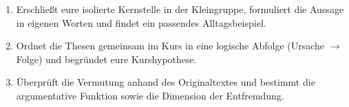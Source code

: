 \documentclass[a4paper, 11pt, parskip=half]{scrartcl}
\begin{document}
\vspace{0.2cm}

\begin{tcolorbox}[
    enhanced, colback=lightBlue, colframe=primaryBlue, boxrule=0.8pt, arc=1mm,
    title=\textbf{Methode: Kernaussagen-Rekonstruktion},
    fonttitle=\small\bfseries\color{white},
    boxed title style={colback=primaryBlue, arc=0mm, boxrule=0pt},
    attach boxed title to top left={yshift=-2mm, xshift=2mm},
    boxsep=4pt, bottom=5pt, top=6pt
]
\small\sffamily
\begin{enumerate}[leftmargin=0.55cm, itemsep=0.08cm, topsep=0.04cm]
    \item Erschließt eure isolierte Kernstelle in der Kleingruppe, formuliert die Aussage in eigenen Worten und findet ein passendes Alltagsbeispiel.
    \item Ordnet die Thesen gemeinsam im Kurs in eine logische Abfolge (Ursache $\rightarrow$ Folge) und begründet eure Kurshypothese.
    \item Überprüft die Vermutung anhand des Originaltextes und bestimmt die argumentative Funktion sowie die Dimension der Entfremdung.
\end{enumerate}
\end{tcolorbox}
\end{document}
